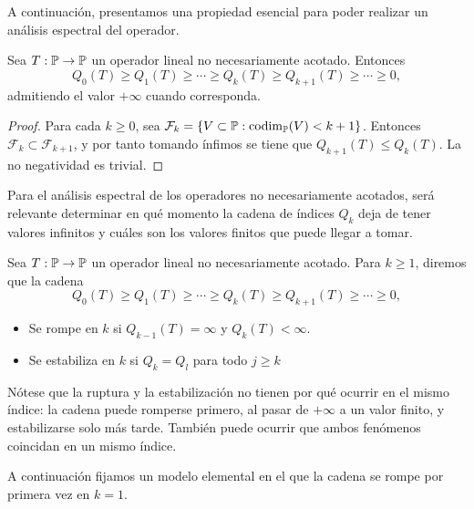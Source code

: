 A continuación, presentamos una propiedad esencial para poder realizar un análisis espectral del operador.
\begin{prop}\label{prop:propiedades_Qk}
	Sea $T:\mathbb{P}\to\mathbb{P}$ un operador lineal no necesariamente acotado. Entonces
	\[
		Q_0(T)\ge Q_1(T)\ge \cdots \ge Q_k(T)\ge Q_{k+1}(T)\ge \cdots \ge 0,
	\]
	admitiendo el valor $+\infty$ cuando corresponda.
\end{prop}

\begin{proof}
	Para cada $k\ge0$, sea \(\mathcal{F}_k = \{ V \subset \mathbb{P} : \operatorname{codim}_{\mathbb{P}}(V) < k+1 \}\). Entonces $\mathcal F_k\subset\mathcal F_{k+1}$, y por tanto tomando ínfimos se tiene que \(Q_{k+1}(T) \le Q_k(T)\).
	La no negatividad es trivial.
\end{proof}

Para el análisis espectral de los operadores no necesariamente acotados, será relevante determinar en qué momento la cadena de índices $Q_k$ deja de tener valores infinitos y cuáles son los valores finitos que puede llegar a tomar.

\begin{defn}
	Sea $T:\mathbb{P}\to\mathbb{P}$ un operador lineal no necesariamente acotado. Para $k\ge1$, diremos que la cadena
	\[
		Q_0(T)\ge Q_1(T)\ge \cdots \ge Q_k(T)\ge Q_{k+1}(T)\ge \cdots \ge 0,
	\]
	\begin{itemize}
		\item Se rompe en $k$ si $Q_{k-1}(T)=\infty$ y $Q_k(T)<\infty$.
		\item Se estabiliza en $k$ si $Q_{k}=Q_{l}$ para todo $j \geq k$
	\end{itemize}
\end{defn}

\begin{rmk}
	Nótese que la ruptura y la estabilización no tienen por qué ocurrir en el mismo índice: la cadena puede romperse primero, al pasar de $+\infty$ a un valor finito, y estabilizarse solo más tarde. También puede ocurrir que ambos fenómenos coincidan en un mismo índice.
\end{rmk}

A continuación fijamos un modelo elemental en el que la cadena se rompe por primera vez en $k=1$.

